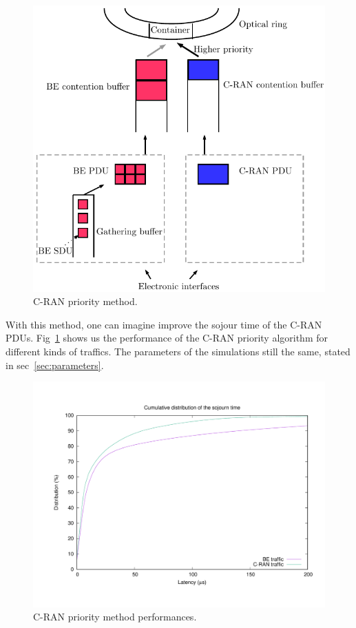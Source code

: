 \documentclass[a4paper,10pt,english]{article}
\begin{document}
    \begin{figure}[h]
\begin{center}   
      \includegraphics[scale=0.7]{cranprio.pdf}
     \caption{C-RAN priority method.}
\end{center}
  \end{figure}
  
  With this method, one can imagine improve the sojour time of the C-RAN PDUs. Fig~\ref{fig:prior} shows us the performance of the C-RAN priority algorithm for different kinds of traffics. The parameters of the simulations still the same, stated in sec~\ref{sec:parameters}.
      \begin{figure}[h]
      \label{fig:prior}
\begin{center}   

      \includegraphics[scale=0.4]{prior.pdf}

     \caption{C-RAN priority method performances.}
\end{center}
  \end{figure}
  
\end{document}
